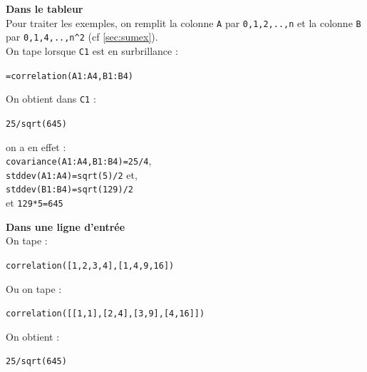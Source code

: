 \documentclass[a4paper,11pt]{book}
\begin{document}
{\bf Dans le tableur}\\
Pour traiter les exemples,  on remplit la colonne {\tt A} par 
{\tt 0,1,2,..,n} et la colonne 
{\tt B} par {\tt 0,1,4,..,n\verb|^|2} (cf \ref{sec:sumex}).\\
On tape lorsque {\tt C1} est en surbrillance :
\begin{center}{\tt =correlation(A1:A4,B1:B4)}\end{center}
On obtient dans {\tt C1} :
\begin{center}{\tt 25/sqrt(645) }\end{center}
on a en effet :\\
{\tt covariance(A1:A4,B1:B4)=25/4},\\
  {\tt stddev(A1:A4)=sqrt(5)/2} et,\\
{\tt stddev(B1:B4)=sqrt(129)/2}\\
et {\tt 129*5=645}

{\bf Dans une ligne d'entr\'ee}\\
On tape :
\begin{center}{\tt correlation([1,2,3,4],[1,4,9,16])}\end{center}
Ou on tape :
\begin{center}{\tt correlation([[1,1],[2,4],[3,9],[4,16]])}\end{center}
On obtient  :
\begin{center}{\tt 25/sqrt(645) }\end{center}
\end{document}
